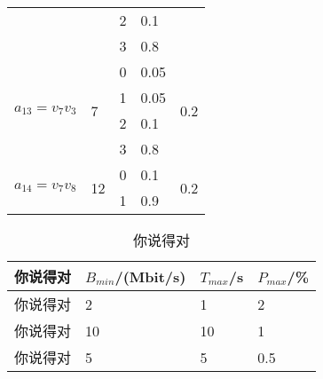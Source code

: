 \begin{longtable}[!ht]{lllll}
		\multicolumn{1}{c}{}                               &                     & 2  & 0.1  &                      \\
		\multicolumn{1}{c}{}                               &                     & 3  & 0.8  &                      \\ \hline
		\multicolumn{1}{c}{\multirow{4}{*}{$a_{13}=v_7 v_3$}} & \multirow{4}{*}{7} & 0  & 0.05 & \multirow{4}{*}{0.2} \\
		\multicolumn{1}{c}{}                               &                     & 1  & 0.05 &                      \\
		\multicolumn{1}{c}{}                               &                     & 2  & 0.1  &                      \\
		\multicolumn{1}{c}{}                               &                     & 3  & 0.8  &                      \\ \hline
		\multirow{2}{*}{$a_{14}=v_7 v_8$}                     & \multirow{2}{*}{12}  & 0  & 0.1  & \multirow{2}{*}{0.2} \\
		&                     & 1  & 0.9  &                      \\ \hline
	 
\end{longtable}

\begin{table}[!ht]
	\centering
	\caption{你说得对}
	\label{config1-3}
	\begin{tabular}{llll}\hline
		\textbf{你说得对} & \textbf{$B_{min}$/(Mbit/s)} & \textbf{$T_{max}$/s} & \textbf{$P_{max}$/\%} \\ \hline
		
		你说得对 & 2 & 1 & 2 \\ 
		你说得对 & 10 & 10 & 1 \\ 
		你说得对 & 5 & 5 & 0.5 \\ \hline
	\end{tabular}
	
\end{table}	





